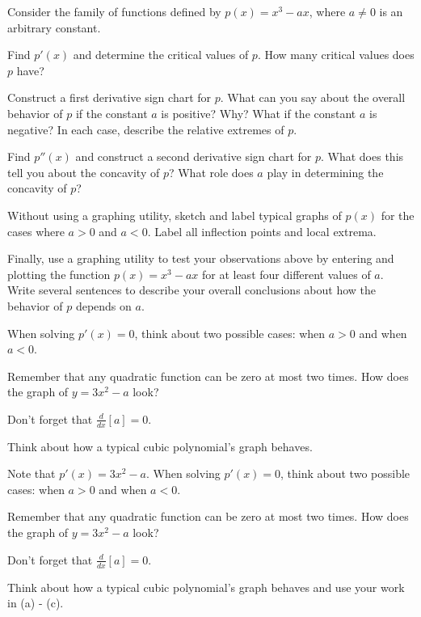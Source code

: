 \begin{activity} \label{A:3.2.1}  Consider the family of functions defined by $p(x) = x^3 - ax$, where $a \ne 0$ is an arbitrary constant.
	\ba
	\item Find $p'(x)$ and determine the critical values of $p$.  How many critical values does $p$ have? 
	\item Construct a first derivative sign chart for $p$.  What can you say about the overall behavior of $p$ if the constant $a$ is positive?  Why?  What if the constant $a$ is negative? In each case, describe the relative extremes of $p$.
	\item Find $p''(x)$ and construct a second derivative sign chart for $p$.  What does this tell you about the concavity of $p$?  What role does $a$ play in determining the concavity of $p$?
	\item Without using a graphing utility, sketch and label typical graphs of $p(x)$ for the cases where $a > 0$ and $a < 0$.  Label all inflection points and local extrema.	
  	\item Finally, use a graphing utility to test your observations above by entering and plotting the function $p(x) = x^3 - ax$ for at least four different values of $a$.  Write several sentences to describe your overall conclusions about how the behavior of $p$ depends on $a$.
	\ea
\end{activity}
\begin{smallhint}
	\ba
	\item When solving $p'(x) = 0$, think about two possible cases: when $a > 0$ and when $a < 0$.
	\item Remember that any quadratic function can be zero at most two times.  How does the graph of $y = 3x^2 - a$ look?
	\item Don't forget that $\frac{d}{dx}[a] = 0$.
	\item Think about how a typical cubic polynomial's graph behaves.	
	\ea
\end{smallhint}
\begin{bighint}
	\ba
	\item Note that $p'(x) = 3x^2 - a$.  When solving $p'(x) = 0$, think about two possible cases: when $a > 0$ and when $a < 0$.
	\item Remember that any quadratic function can be zero at most two times.  How does the graph of $y = 3x^2 - a$ look?
	\item Don't forget that $\frac{d}{dx}[a] = 0$.
	\item Think about how a typical cubic polynomial's graph behaves and use your work in (a) - (c).	
	\ea
\end{bighint}
